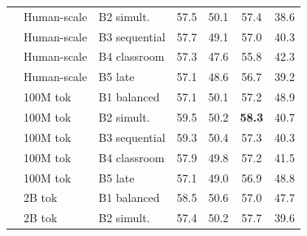 \documentclass[11pt]{article}
\begin{document}
\begin{table}[!ht]
\begin{minipage}[t]{0.49\linewidth}
\begin{tabular}{ll l cccc}
 & Human-scale & B2 simult. & \cellcolor[rgb]{0.922,1.000,0.922} 57.5 & \cellcolor[rgb]{0.999,1.000,0.999} 50.1 & \cellcolor[rgb]{0.902,1.000,0.902} 57.4 & \cellcolor[rgb]{1.000,0.874,0.874} 38.6 \\
 & Human-scale & B3 sequential & \cellcolor[rgb]{0.920,1.000,0.920} 57.7 & \cellcolor[rgb]{1.000,0.991,0.991} 49.1 & \cellcolor[rgb]{0.907,1.000,0.907} 57.0 & \cellcolor[rgb]{1.000,0.893,0.893} 40.3 \\
 & Human-scale & B4 classroom & \cellcolor[rgb]{0.924,1.000,0.924} 57.3 & \cellcolor[rgb]{1.000,0.977,0.977} 47.6 & \cellcolor[rgb]{0.923,1.000,0.923} 55.8 & \cellcolor[rgb]{1.000,0.915,0.915} 42.3 \\
 & Human-scale & B5 late & \cellcolor[rgb]{0.926,1.000,0.926} 57.1 & \cellcolor[rgb]{1.000,0.987,0.987} 48.6 & \cellcolor[rgb]{0.911,1.000,0.911} 56.7 & \cellcolor[rgb]{1.000,0.881,0.881} 39.2 \\
\addlinespace[1.5pt]
 & 100M tok & B1 balanced & \cellcolor[rgb]{0.926,1.000,0.926} 57.1 & \cellcolor[rgb]{0.999,1.000,0.999} 50.1 & \cellcolor[rgb]{0.905,1.000,0.905} 57.2 & \cellcolor[rgb]{1.000,0.988,0.988} 48.9 \\
 & 100M tok & B2 simult. & \cellcolor[rgb]{0.901,1.000,0.901} 59.5 & \cellcolor[rgb]{0.997,1.000,0.997} 50.2 & \cellcolor[rgb]{0.890,1.000,0.890} \textbf{58.3} & \cellcolor[rgb]{1.000,0.898,0.898} 40.7 \\
 & 100M tok & B3 sequential & \cellcolor[rgb]{0.903,1.000,0.903} 59.3 & \cellcolor[rgb]{0.995,1.000,0.995} 50.4 & \cellcolor[rgb]{0.903,1.000,0.903} 57.3 & \cellcolor[rgb]{1.000,0.893,0.893} 40.3 \\
 & 100M tok & B4 classroom & \cellcolor[rgb]{0.918,1.000,0.918} 57.9 & \cellcolor[rgb]{1.000,0.998,0.998} 49.8 & \cellcolor[rgb]{0.905,1.000,0.905} 57.2 & \cellcolor[rgb]{1.000,0.906,0.906} 41.5 \\
 & 100M tok & B5 late & \cellcolor[rgb]{0.926,1.000,0.926} 57.1 & \cellcolor[rgb]{1.000,0.990,0.990} 49.0 & \cellcolor[rgb]{0.909,1.000,0.909} 56.9 & \cellcolor[rgb]{1.000,0.987,0.987} 48.8 \\
\addlinespace[1.5pt]
 & 2B tok & B1 balanced & \cellcolor[rgb]{0.911,1.000,0.911} 58.5 & \cellcolor[rgb]{0.992,1.000,0.992} 50.6 & \cellcolor[rgb]{0.907,1.000,0.907} 57.0 & \cellcolor[rgb]{1.000,0.975,0.975} 47.7 \\
 & 2B tok & B2 simult. & \cellcolor[rgb]{0.923,1.000,0.923} 57.4 & \cellcolor[rgb]{0.997,1.000,0.997} 50.2 & \cellcolor[rgb]{0.898,1.000,0.898} 57.7 & \cellcolor[rgb]{1.000,0.885,0.885} 39.6 \\

\end{tabular}
\end{minipage}
\end{table}
\end{document}
